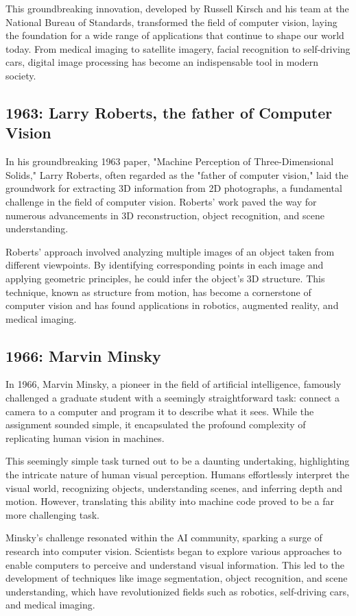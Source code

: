 \documentclass{report}
\begin{document}
This groundbreaking innovation, developed by Russell Kirsch and his team at the National Bureau of Standards, transformed the field of computer vision, laying the foundation for a wide range of applications that continue to shape our world today. From medical imaging to satellite imagery, facial recognition to self-driving cars, digital image processing has become an indispensable tool in modern society.

\subsection{1963: Larry Roberts, the father of Computer Vision}
In his groundbreaking 1963 paper, "Machine Perception of Three-Dimensional Solids," Larry Roberts, often regarded as the "father of computer vision," laid the groundwork for extracting 3D information from 2D photographs, a fundamental challenge in the field of computer vision. Roberts' work paved the way for numerous advancements in 3D reconstruction, object recognition, and scene understanding.

Roberts' approach involved analyzing multiple images of an object taken from different viewpoints. By identifying corresponding points in each image and applying geometric principles, he could infer the object's 3D structure. This technique, known as structure from motion, has become a cornerstone of computer vision and has found applications in robotics, augmented reality, and medical imaging.

\subsection{1966: Marvin Minsky}

In 1966, Marvin Minsky, a pioneer in the field of artificial intelligence, famously challenged a graduate student with a seemingly straightforward task: connect a camera to a computer and program it to describe what it sees. While the assignment sounded simple, it encapsulated the profound complexity of replicating human vision in machines.

This seemingly simple task turned out to be a daunting undertaking, highlighting the intricate nature of human visual perception. Humans effortlessly interpret the visual world, recognizing objects, understanding scenes, and inferring depth and motion. However, translating this ability into machine code proved to be a far more challenging task.

Minsky's challenge resonated within the AI community, sparking a surge of research into computer vision. Scientists began to explore various approaches to enable computers to perceive and understand visual information. This led to the development of techniques like image segmentation, object recognition, and scene understanding, which have revolutionized fields such as robotics, self-driving cars, and medical imaging.
\end{document}
